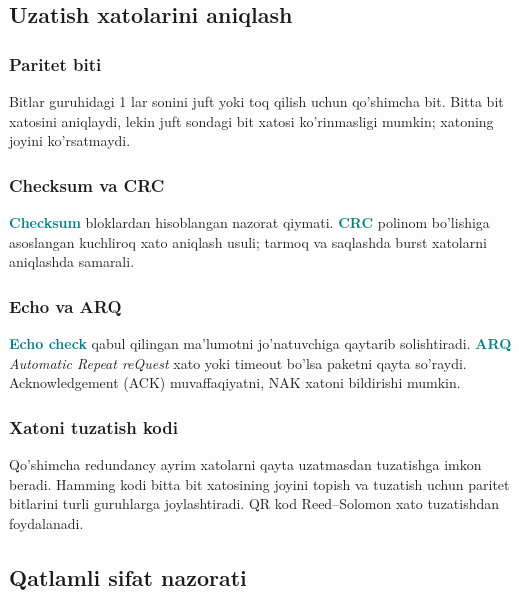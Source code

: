 \documentclass[11pt,a4paper,oneside]{book}
\newcommand{\term}[1]{\textbf{\textcolor{Teal}{#1}}\index{#1}}
\newcommand{\eng}[1]{\textit{\textcolor{Muted}{#1}}}
\begin{document}
\subsection{Uzatish xatolarini aniqlash}
\subsubsection{Paritet biti}
Bitlar guruhidagi 1 lar sonini juft yoki toq qilish uchun qo'shimcha bit. Bitta bit xatosini aniqlaydi, lekin juft sondagi bit xatosi ko'rinmasligi mumkin; xatoning joyini ko'rsatmaydi.

\subsubsection{Checksum va CRC}
\term{Checksum} bloklardan hisoblangan nazorat qiymati. \term{CRC} polinom bo'lishiga asoslangan kuchliroq xato aniqlash usuli; tarmoq va saqlashda burst xatolarni aniqlashda samarali.

\subsubsection{Echo va ARQ}
\term{Echo check} qabul qilingan ma'lumotni jo'natuvchiga qaytarib solishtiradi. \term{ARQ} \eng{Automatic Repeat reQuest} xato yoki timeout bo'lsa paketni qayta so'raydi. Acknowledgement (ACK) muvaffaqiyatni, NAK xatoni bildirishi mumkin.

\subsubsection{Xatoni tuzatish kodi}
Qo'shimcha redundancy ayrim xatolarni qayta uzatmasdan tuzatishga imkon beradi. Hamming kodi bitta bit xatosining joyini topish va tuzatish uchun paritet bitlarini turli guruhlarga joylashtiradi. QR kod Reed--Solomon xato tuzatishdan foydalanadi.
\subsection{Qatlamli sifat nazorati}
\begin{center}
\end{center}
\end{document}

